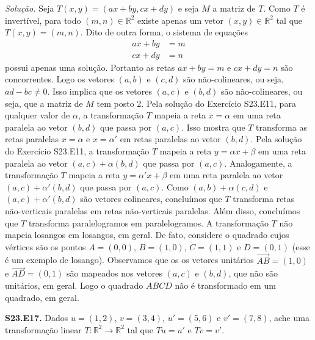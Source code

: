 \documentclass[a4paper,11pt]{article}
\newcommand{\R}{\mathbb{R}}
\begin{document}
\emph{Solução.}
Seja $T(x,y) = (ax + by, cx + dy)$ e seja $M$ a matriz de $T$.
Como $T$ é invertível, para todo $(m,n) \in \R^2$ existe apenas um vetor $(x,y) \in \R^2$ tal que $T(x,y) = (m,n)$.
Dito de outra forma, o sistema de equações
\begin{align*}
  ax + by & = m \\
  cx + dy & = n
\end{align*}
possui apenas uma solução.
Portanto as retas $ax + by = m$ e $cx + dy = n$ são concorrentes.
Logo os vetores $(a,b)$ e $(c,d)$ são não-colineares, ou seja, $ad - bc \neq 0$.
Isso implica que os vetores $(a,c)$ e $(b,d)$ são não-colineares, ou seja, que a matriz de $M$ tem posto 2.
Pela solução do Exercício S23.E11, para qualquer valor de $\alpha$, a transformação $T$ mapeia a reta $x = \alpha$ em uma reta paralela ao vetor $(b,d)$ que passa por $(a,c)$.
Isso mostra que $T$ transforma as retas paralelas $x = \alpha$ e $x = \alpha'$ em retas paralelas ao vetor $(b,d)$.
Pela solução do Exercício S23.E11, a transformação $T$ mapeia a reta $y = \alpha x + \beta$ em uma reta paralela ao vetor $(a,c) + \alpha(b,d)$ que passa por $(a,c)$.
Analogamente, a transformação $T$ mapeia a reta $y = \alpha' x + \beta$ em uma reta paralela ao vetor $(a,c) + \alpha'(b,d)$ que passa por $(a,c)$.
Como $(a,b) + \alpha(c,d)$ e $(a,c) + \alpha'(b,d)$ são vetores colineares, concluímos que $T$ transforma retas não-verticais paralelas em retas não-verticais paralelas.
Além disso, concluímos que $T$ transforma paralelogramos em paralelogramos.
A transformação $T$ não mapeia losangos em losangos, em geral.
De fato, considere o quadrado cujos vértices são os pontos $A = (0,0)$, $B = (1,0)$, $C = (1,1)$ e $D = (0,1)$ (esse é um exemplo de losango).
Observamos que os os vetores unitários $\overrightarrow{AB} = (1,0)$ e $\overrightarrow{AD} = (0,1)$ são mapeados nos vetores $(a,c)$ e $(b,d)$, que não são unitários, em geral.
Logo o quadrado $ABCD$ não é transformado em um quadrado, em geral.

\vspace{\baselineskip}

\textbf{S23.E17.}
Dados $u = (1,2)$, $v = (3,4)$, $u' = (5,6)$ e $v' = (7,8)$, ache uma transformação linear $T : \mathbb{R}^2 \to \mathbb{R}^2$ tal que $Tu = u'$ e $Tv = v'$.

\vspace{\baselineskip}
\end{document}
